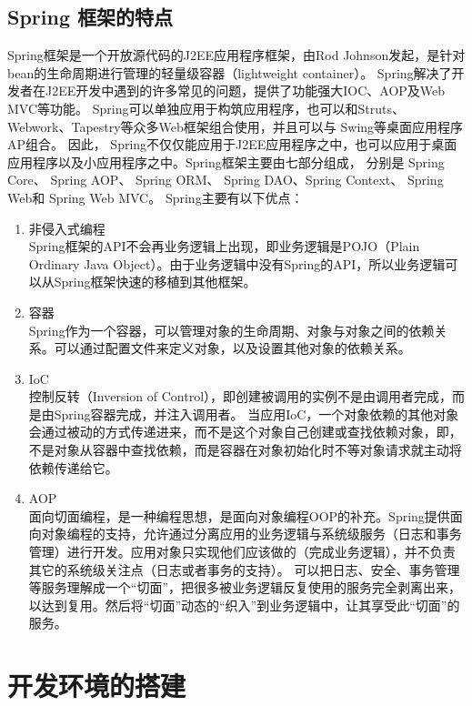 \subsection{Spring 框架的特点}
Spring框架是一个开放源代码的J2EE应用程序框架，由Rod Johnson发起，是针对bean的生命周期进行管理的轻量级容器（lightweight container）。
Spring解决了开发者在J2EE开发中遇到的许多常见的问题，提供了功能强大IOC、AOP及Web MVC等功能。
Spring可以单独应用于构筑应用程序，也可以和Struts、Webwork、Tapestry等众多Web框架组合使用，并且可以与 Swing等桌面应用程序AP组合。
因此， Spring不仅仅能应用于J2EE应用程序之中，也可以应用于桌面应用程序以及小应用程序之中。Spring框架主要由七部分组成，
分别是 Spring Core、 Spring AOP、 Spring ORM、 Spring DAO、Spring Context、 Spring Web和 Spring Web MVC。
Spring主要有以下优点：
\par
\begin{enumerate}
	\item 非侵入式编程 \\
	Spring框架的API不会再业务逻辑上出现，即业务逻辑是POJO（Plain Ordinary Java Object）。由于业务逻辑中没有Spring的API，所以业务逻辑可以从Spring框架快速的移植到其他框架。
	\item 容器 \\
	Spring作为一个容器，可以管理对象的生命周期、对象与对象之间的依赖关系。可以通过配置文件来定义对象，以及设置其他对象的依赖关系。
	\item IoC \\
	控制反转（Inversion of Control），即创建被调用的实例不是由调用者完成，而是由Spring容器完成，并注入调用者。
当应用IoC，一个对象依赖的其他对象会通过被动的方式传递进来，而不是这个对象自己创建或查找依赖对象，即，不是对象从容器中查找依赖，而是容器在对象初始化时不等对象请求就主动将依赖传递给它。
	\item AOP \\
	面向切面编程，是一种编程思想，是面向对象编程OOP的补充。Spring提供面向对象编程的支持，允许通过分离应用的业务逻辑与系统级服务（日志和事务管理）进行开发。应用对象只实现他们应该做的（完成业务逻辑），并不负责其它的系统级关注点（日志或者事务的支持）。
可以把日志、安全、事务管理等服务理解成一个“切面”，把很多被业务逻辑反复使用的服务完全剥离出来，以达到复用。然后将“切面”动态的“织入”到业务逻辑中，让其享受此“切面”的服务。
\end{enumerate}
\section{开发环境的搭建}
